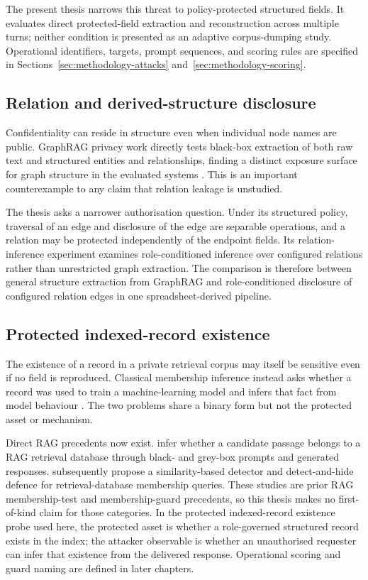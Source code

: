The present thesis narrows this threat to policy-protected structured fields. It evaluates direct protected-field extraction and reconstruction across multiple turns; neither condition is presented as an adaptive corpus-dumping study. Operational identifiers, targets, prompt sequences, and scoring rules are specified in Sections~\ref{sec:methodology-attacks} and~\ref{sec:methodology-scoring}.

\subsection{Relation and derived-structure disclosure}

Confidentiality can reside in structure even when individual node names are public. GraphRAG privacy work directly tests black-box extraction of both raw text and structured entities and relationships, finding a distinct exposure surface for graph structure in the evaluated systems \citep{liu2026graphragprivacy}. This is an important counterexample to any claim that relation leakage is unstudied.

The thesis asks a narrower authorisation question. Under its structured policy, traversal of an edge and disclosure of the edge are separable operations, and a relation may be protected independently of the endpoint fields. Its relation-inference experiment examines role-conditioned inference over configured relations rather than unrestricted graph extraction. The comparison is therefore between general structure extraction from GraphRAG and role-conditioned disclosure of configured relation edges in one spreadsheet-derived pipeline.

\subsection{Protected indexed-record existence}

The existence of a record in a private retrieval corpus may itself be sensitive even if no field is reproduced. Classical membership inference instead asks whether a record was used to train a machine-learning model and infers that fact from model behaviour \citep{shokri2017membership}. The two problems share a binary form but not the protected asset or mechanism.

Direct RAG precedents now exist. \citet{anderson2025ragmia} infer whether a candidate passage belongs to a RAG retrieval database through black- and grey-box prompts and generated responses. \citet{choi2025safeguarding} subsequently propose a similarity-based detector and detect-and-hide defence for retrieval-database membership queries. These studies are prior RAG membership-test and membership-guard precedents, so this thesis makes no first-of-kind claim for those categories. In the protected indexed-record existence probe used here, the protected asset is whether a role-governed structured record exists in the index; the attacker observable is whether an unauthorised requester can infer that existence from the delivered response. Operational scoring and guard naming are defined in later chapters.

